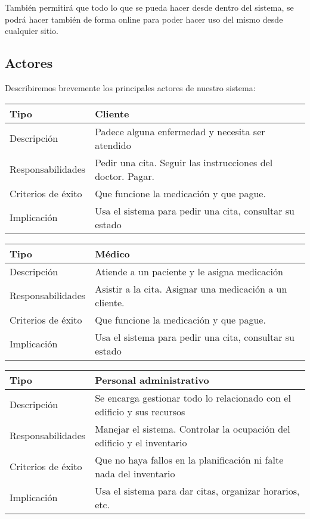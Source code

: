 \documentclass[11pt]{article}
\begin{document}
También permitirá que todo lo que se pueda hacer desde dentro del sistema, se podrá hacer también de forma online para poder hacer uso del mismo desde cualquier sitio.

\subsection{Actores}
\label{sec-1-1}

Describiremos brevemente los principales actores de nuestro sistema:

\begin{tabular}{|l|l|}
\hline
Tipo               &  Cliente \\ \hline
Descripción        &  Padece alguna enfermedad y necesita ser atendido\\ \hline
Responsabilidades  &  Pedir una cita. Seguir las instrucciones del doctor. Pagar. \\ \hline
Criterios de éxito &  Que funcione la medicación y que pague. \\ \hline
Implicación        &  Usa el sistema para pedir una cita, consultar su estado\\ \hline
\end{tabular} 

\begin{tabular}{|l|l|}
\hline
Tipo               &  Médico \\ \hline
Descripción        &  Atiende a un paciente y le asigna medicación\\ \hline
Responsabilidades  &  Asistir a la cita. Asignar una medicación a un cliente. \\ \hline
Criterios de éxito &  Que funcione la medicación y que pague. \\ \hline
Implicación        &  Usa el sistema para pedir una cita, consultar su estado\\ \hline
\end{tabular} 

\begin{tabular}{|l|l|}
\hline
Tipo               &  Personal administrativo \\ \hline
Descripción        &  Se encarga gestionar todo lo relacionado con el edificio y sus recursos\\ \hline
Responsabilidades  &  Manejar el sistema. Controlar la ocupación del edificio y el inventario \\ \hline
Criterios de éxito &  Que no haya fallos en la planificación ni falte nada del inventario \\ \hline
Implicación        &  Usa el sistema para dar citas, organizar horarios, etc. \\ \hline
\end{tabular}
\end{document}
